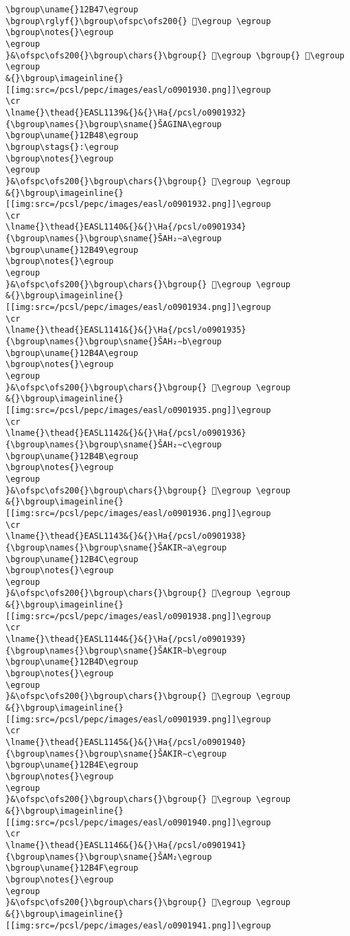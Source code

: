 \begin{verbatim}
\bgroup\uname{}12B47\egroup
\bgroup\rglyf{}\bgroup\ofspc\ofs200{} 𒭇\egroup \egroup
\bgroup\notes{}\egroup
\egroup
}&\ofspc\ofs200{}\bgroup\chars{}\bgroup{} 𒭆\egroup \bgroup{} 𒭇\egroup \egroup
&{}\bgroup\imageinline{}[[img:src=/pcsl/pepc/images/easl/o0901930.png]]\egroup
\cr
\lname{}\thead{}EASL1139&{}&{}\Ha{/pcsl/o0901932}{\bgroup\names{}\bgroup\sname{}ŠAGINA\egroup
\bgroup\uname{}12B48\egroup
\bgroup\stags{}:\egroup
\bgroup\notes{}\egroup
\egroup
}&\ofspc\ofs200{}\bgroup\chars{}\bgroup{} 𒭈\egroup \egroup
&{}\bgroup\imageinline{}[[img:src=/pcsl/pepc/images/easl/o0901932.png]]\egroup
\cr
\lname{}\thead{}EASL1140&{}&{}\Ha{/pcsl/o0901934}{\bgroup\names{}\bgroup\sname{}ŠAH₂∼a\egroup
\bgroup\uname{}12B49\egroup
\bgroup\notes{}\egroup
\egroup
}&\ofspc\ofs200{}\bgroup\chars{}\bgroup{} 𒭉\egroup \egroup
&{}\bgroup\imageinline{}[[img:src=/pcsl/pepc/images/easl/o0901934.png]]\egroup
\cr
\lname{}\thead{}EASL1141&{}&{}\Ha{/pcsl/o0901935}{\bgroup\names{}\bgroup\sname{}ŠAH₂∼b\egroup
\bgroup\uname{}12B4A\egroup
\bgroup\notes{}\egroup
\egroup
}&\ofspc\ofs200{}\bgroup\chars{}\bgroup{} 𒭊\egroup \egroup
&{}\bgroup\imageinline{}[[img:src=/pcsl/pepc/images/easl/o0901935.png]]\egroup
\cr
\lname{}\thead{}EASL1142&{}&{}\Ha{/pcsl/o0901936}{\bgroup\names{}\bgroup\sname{}ŠAH₂∼c\egroup
\bgroup\uname{}12B4B\egroup
\bgroup\notes{}\egroup
\egroup
}&\ofspc\ofs200{}\bgroup\chars{}\bgroup{} 𒭋\egroup \egroup
&{}\bgroup\imageinline{}[[img:src=/pcsl/pepc/images/easl/o0901936.png]]\egroup
\cr
\lname{}\thead{}EASL1143&{}&{}\Ha{/pcsl/o0901938}{\bgroup\names{}\bgroup\sname{}ŠAKIR∼a\egroup
\bgroup\uname{}12B4C\egroup
\bgroup\notes{}\egroup
\egroup
}&\ofspc\ofs200{}\bgroup\chars{}\bgroup{} 𒭌\egroup \egroup
&{}\bgroup\imageinline{}[[img:src=/pcsl/pepc/images/easl/o0901938.png]]\egroup
\cr
\lname{}\thead{}EASL1144&{}&{}\Ha{/pcsl/o0901939}{\bgroup\names{}\bgroup\sname{}ŠAKIR∼b\egroup
\bgroup\uname{}12B4D\egroup
\bgroup\notes{}\egroup
\egroup
}&\ofspc\ofs200{}\bgroup\chars{}\bgroup{} 𒭍\egroup \egroup
&{}\bgroup\imageinline{}[[img:src=/pcsl/pepc/images/easl/o0901939.png]]\egroup
\cr
\lname{}\thead{}EASL1145&{}&{}\Ha{/pcsl/o0901940}{\bgroup\names{}\bgroup\sname{}ŠAKIR∼c\egroup
\bgroup\uname{}12B4E\egroup
\bgroup\notes{}\egroup
\egroup
}&\ofspc\ofs200{}\bgroup\chars{}\bgroup{} 𒭎\egroup \egroup
&{}\bgroup\imageinline{}[[img:src=/pcsl/pepc/images/easl/o0901940.png]]\egroup
\cr
\lname{}\thead{}EASL1146&{}&{}\Ha{/pcsl/o0901941}{\bgroup\names{}\bgroup\sname{}ŠAM₂\egroup
\bgroup\uname{}12B4F\egroup
\bgroup\notes{}\egroup
\egroup
}&\ofspc\ofs200{}\bgroup\chars{}\bgroup{} 𒭏\egroup \egroup
&{}\bgroup\imageinline{}[[img:src=/pcsl/pepc/images/easl/o0901941.png]]\egroup

\end{verbatim}

